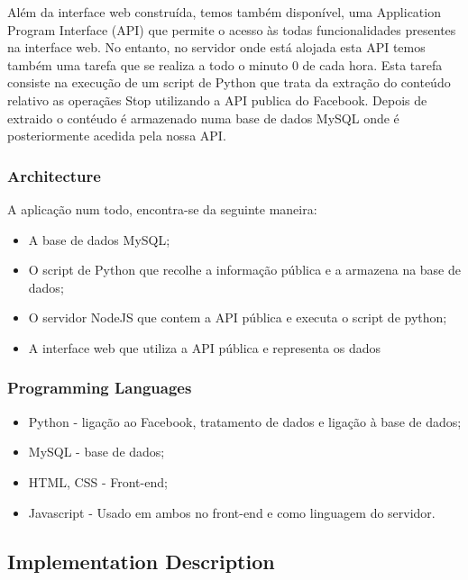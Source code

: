\documentclass[12pt]{article}
\begin{document}
Além da interface web construída, temos também disponível, uma Application Program Interface (API) que permite o acesso às todas funcionalidades presentes na interface web. No entanto, no servidor onde está alojada esta API temos também uma tarefa que se realiza a todo o minuto 0 de cada hora. Esta tarefa consiste na execução de um script de Python que trata da extração do conteúdo relativo as operaçães Stop utilizando a API publica do Facebook. Depois de extraido o contéudo é armazenado numa base de dados MySQL onde é posteriormente acedida pela nossa API.

\subsubsection{Architecture}
A aplicação num todo, encontra-se da seguinte maneira:
\begin{itemize}
	\item A base de dados MySQL;
	\item O script de Python que recolhe a informação pública e a armazena na base de dados;
	\item O servidor NodeJS que contem a API pública e executa o script de python;
	\item A interface web que utiliza a API pública e representa os dados
\end{itemize}
\subsubsection{Programming Languages}
\begin{itemize}
	\item Python - ligação ao Facebook, tratamento de dados e ligação à base de dados;
	\item MySQL - base de dados;
	\item HTML, CSS - Front-end;
	\item Javascript - Usado em ambos no front-end e como linguagem do servidor.
\end{itemize}


\subsection{Implementation Description}
\end{document}
